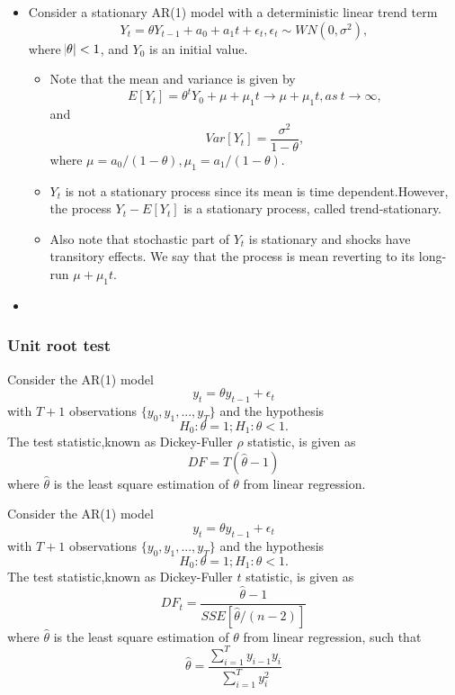 \begin{example}
\begin{itemize}
	\item Consider a stationary AR(1) model with a deterministic linear trend term
	$$Y_t = \theta Y_{t-1} + a_0 + a_1 t + \epsilon_t, \epsilon_t\sim WN(0,\sigma^2),$$
	where $\abs{\theta} < 1$, and $Y_0$ is an initial value.
	\begin{itemize}
		\item 	Note that the mean and variance is given by
		$$E[Y_t] = \theta^t Y_0 + \mu + \mu_1t \to \mu + \mu_1t, as~ t\to\infty,$$
		and
		$$Var[Y_t] = \frac{\sigma^2}{1-\theta},$$
		where $\mu = a_0/(1-\theta), \mu_1=a_1/(1-\theta)$.
		
		\item $Y_t$ is not a stationary process since its mean is time dependent.However, the process $Y_t - E[Y_t]$ is a stationary process, called trend-stationary.
		\item Also note that stochastic part of $Y_t$ is stationary and shocks have transitory effects. We say that the process is mean reverting to its long-run $ \mu + \mu_1t$.
	\end{itemize}
	\item 

	
\end{itemize}	
	
\end{example}



\subsubsection{Unit root test}
\begin{definition} \cite[574]{hayashi2000econometrics}
Consider the AR(1) model
$$y_t = \theta y_{t-1} + \epsilon_t$$ with $T+1$ observations $\{y_0,y_1,...,y_T\}$ and the hypothesis
$$H_0: \theta = 1; H_1: \theta < 1.$$
The test statistic,known as Dickey-Fuller $\rho$ statistic, is given as
$$DF = T(\hat{\theta} - 1)$$
where $\hat{\theta}$ is the least square estimation of $\theta$ from linear regression.
\end{definition}


\begin{definition} \cite[574]{hayashi2000econometrics}
Consider the AR(1) model
$$y_t = \theta y_{t-1} + \epsilon_t$$ with $T+1$ observations $\{y_0,y_1,...,y_T\}$ and the hypothesis
$$H_0: \theta = 1; H_1: \theta < 1.$$
The test statistic,known as Dickey-Fuller $t$ statistic, is given as
$$DF_t = \frac{\hat{\theta} - 1}{SSE[\hat{\theta}/(n-2)]}$$
where $\hat{\theta}$ is the least square estimation of $\theta$ from linear regression, such that
$$\hat{\theta} = \frac{\sum_{i=1}^T y_{i-1}y_i}{\sum_{i=1}^T y_i^2}$$
\end{definition}

